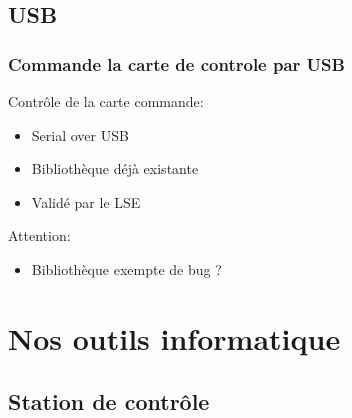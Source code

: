 \documentclass[transparent]{beamer}
\begin{document}
\subsection{USB}

\begin{frame}
\frametitle{Commande la carte de controle par USB}
	\begin{block}{Contrôle de la carte commande:}
			\begin{itemize}
				\item Serial over USB
				\item Bibliothèque déjà existante
				\item Validé par le LSE
			\end{itemize}
	\end{block}
	\begin{block}{Attention:}
			\begin{itemize}
				\item Bibliothèque exempte de bug ?
			\end{itemize}
	\end{block}
\end{frame}

\section{Nos outils informatique}
\subsection{Station de contrôle}
\end{document}
